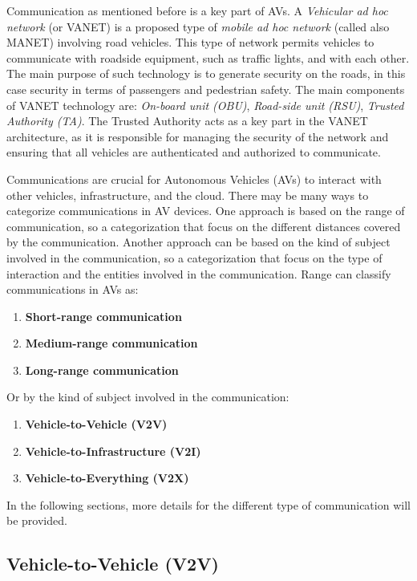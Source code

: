 Communication as mentioned before is a key part of AVs.
A \textit{Vehicular ad hoc network} (or VANET) is a proposed type of \textit{mobile ad hoc network} (called also MANET)
involving road vehicles.
This type of network permits vehicles to communicate with roadside equipment,
such as traffic lights, and with each other\cite{sheikh2019comprehensive}.
The main purpose of such technology is to generate security on the roads,
in this case security in terms of passengers and pedestrian safety.
The main components of VANET technology are: \textit{On-board unit (OBU)},
\textit{Road-side unit (RSU)}, \textit{Trusted Authority (TA)}.
The Trusted Authority acts as a key part in the VANET architecture,
as it is responsible for managing the security of the network and ensuring that all vehicles are authenticated
and authorized to communicate.

Communications are crucial for Autonomous Vehicles (AVs) to interact with other vehicles, infrastructure, and the cloud.
There may be many ways to categorize communications in AV devices.
One approach is based on the range of communication,
so a categorization that focus on the different distances covered by the communication.
Another approach can be based on the kind of subject involved in the communication,
so a categorization that focus on the type of interaction and the entities involved in the communication.
Range can classify communications in AVs as:
\begin{enumerate}
    \item \textbf{Short-range communication}
    \item \textbf{Medium-range communication}
    \item \textbf{Long-range communication}
\end{enumerate}

Or by the kind of subject involved in the communication:
\begin{enumerate}
    \item \textbf{Vehicle-to-Vehicle (V2V)}
    \item \textbf{Vehicle-to-Infrastructure (V2I)}
    \item \textbf{Vehicle-to-Everything (V2X)}
\end{enumerate}

In the following sections, more details for the different type of communication will be provided.

\subsection{Vehicle-to-Vehicle (V2V)}\label{subsec:vehicle-to-vehicle-(v2v)}

